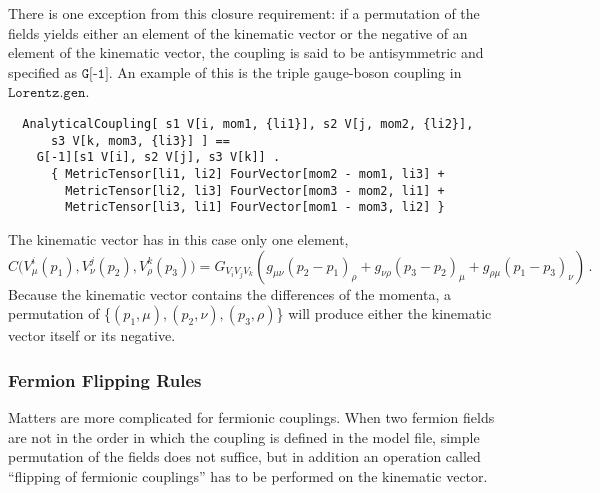 \documentclass[twoside,12pt]{article}
\def\Code#1{\ensuremath{\texttt{#1}}}
\begin{document}
There is one exception from this closure requirement: if a permutation of
the fields yields either an element of the kinematic vector or the
negative of an element of the kinematic vector, the coupling is said to be
antisymmetric and specified as \Code{G[-1]}.  An example of this is the
triple gauge-boson coupling in \Code{Lorentz.gen}.
%
\begin{verbatim}
  AnalyticalCoupling[ s1 V[i, mom1, {li1}], s2 V[j, mom2, {li2}],
      s3 V[k, mom3, {li3}] ] ==
    G[-1][s1 V[i], s2 V[j], s3 V[k]] .
      { MetricTensor[li1, li2] FourVector[mom2 - mom1, li3] +
        MetricTensor[li2, li3] FourVector[mom3 - mom2, li1] +
        MetricTensor[li3, li1] FourVector[mom1 - mom3, li2] }
\end{verbatim}
The kinematic vector has in this case only one element,
%
$$
C\bigl(V_{\!\mu}^i(p_1), V_{\!\nu}^j(p_2), V_{\!\rho}^k(p_3)\bigr) =
G_{V_{\!i}V_{\!j}V_{\!k}}\left(g_{\mu\nu} (p_2 - p_1)_\rho +
g_{\nu\rho} (p_3 - p_2)_\mu +
g_{\rho\mu} (p_1 - p_3)_\nu\right)\,.
$$
Because the kinematic vector contains the differences of the momenta, a
permutation of \{$(p_1,\mu), (p_2,\nu), (p_3,\rho)$\} will produce either
the kinematic vector itself or its negative.


\subsubsection*{Fermion Flipping Rules}%
%

Matters are more complicated for fermionic couplings.  When two fermion
fields are not in the order in which the coupling is defined in the model
file, simple permutation of the fields does not suffice, but in addition
an operation called ``flipping of fermionic couplings'' has to be
performed on the kinematic vector.
\end{document}
